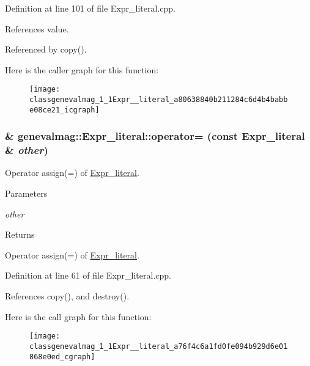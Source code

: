 Definition at line 101 of file Expr\_\-literal.cpp.



References value.



Referenced by copy().



Here is the caller graph for this function:\nopagebreak
\begin{figure}[H]
\begin{center}
\leavevmode
\texttt{[image: classgenevalmag\_1\_1Expr\_\_literal\_a80638840b211284c6d4b4babbe08ce21\_icgraph]}
\end{center}
\end{figure}


\hypertarget{classgenevalmag_1_1Expr__literal_a76f4c6a1fd0fe094b929d6e01868e0ed}{
\subsubsection[{operator=}]{ \& genevalmag::Expr\_\-literal::operator= (const {\bf Expr\_\-literal} \& {\em other})}}
\label{classgenevalmag_1_1Expr__literal_a76f4c6a1fd0fe094b929d6e01868e0ed}
Operator assign(=) of \hyperlink{classgenevalmag_1_1Expr__literal}{Expr\_\-literal}. 
\begin{DoxyParams}{Parameters}
\item[{\em other}]\end{DoxyParams}
\begin{DoxyReturn}{Returns}

\end{DoxyReturn}
Operator assign(=) of \hyperlink{classgenevalmag_1_1Expr__literal}{Expr\_\-literal}. 

Definition at line 61 of file Expr\_\-literal.cpp.



References copy(), and destroy().



Here is the call graph for this function:\nopagebreak
\begin{figure}[H]
\begin{center}
\leavevmode
\texttt{[image: classgenevalmag\_1\_1Expr\_\_literal\_a76f4c6a1fd0fe094b929d6e01868e0ed\_cgraph]}
\end{center}
\end{figure}


